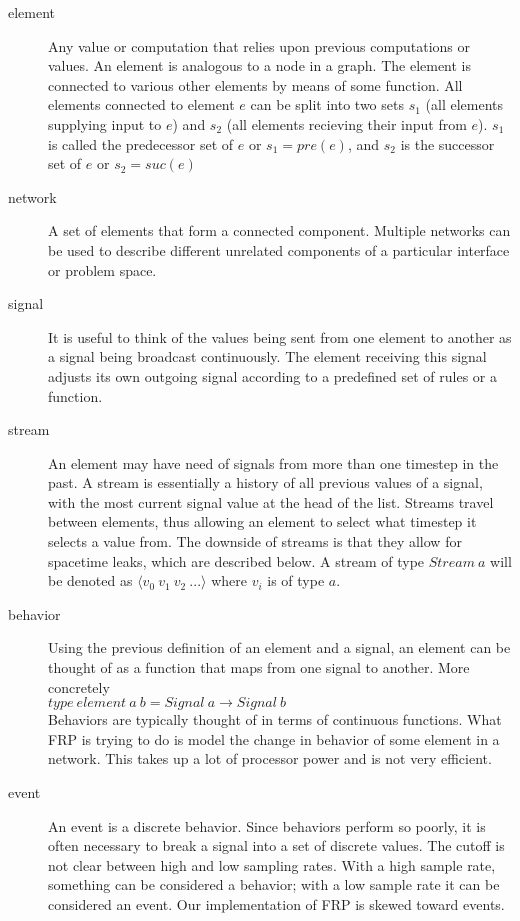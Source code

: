 \documentclass[twocolumn]{paper}
\begin{document}
\begin{description}
\item[element] Any value or computation that relies upon previous computations or values. An element is analogous to a node in a graph. The element is connected to various other elements by means of some function. All elements connected to element $e$ can be split into two sets $s_1$ (all elements supplying input to $e$) and $s_2$ (all elements recieving their input from $e$). $s_1$ is called the predecessor set of $e$ or $s_1 = pre(e)$, and $s_2$ is the successor set of $e$ or $s_2 = suc(e)$

\item[network] A set of elements that form a connected component. Multiple networks can be used to describe different unrelated components of a particular interface or problem space.

\item[signal] It is useful to think of the values being sent from one element to another as a signal being broadcast continuously. The element receiving this signal adjusts its own outgoing signal according to a predefined set of rules or a function.

\item[stream] An element may have need of signals from more than one timestep in the past. A stream is essentially a history of all previous values of a signal, with the most current signal value at the head of the list. Streams travel between elements, thus allowing an element to select what timestep it selects a value from. The downside of streams is that they allow for spacetime leaks, which are described below. A stream of type $Stream~a$ will be denoted as $\langle v_0~v_1~v_2~...\rangle$ where $v_i$ is of type $
a$.

\item[behavior] Using the previous definition of an element and a signal, an element can be thought of as a function that maps from one signal to another. More concretely \\
  $type~element~a~b = Signal ~a \rightarrow Signal ~b$\\
  Behaviors are typically thought of in terms of continuous functions. What FRP is trying to do is model the change in behavior of some element in a network. This takes up a lot of processor power  and is not very efficient.

\item[event] An event is a discrete behavior. Since behaviors perform so poorly, it is often necessary to break a signal into a set of discrete values. The cutoff is not clear between high and low sampling rates. With a high sample rate, something can be considered a behavior; with a low sample rate it can be considered an event. Our implementation of FRP is skewed toward events.


\end{description}
\end{document}
